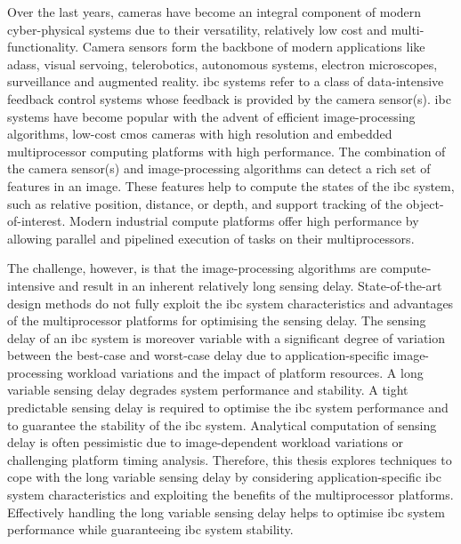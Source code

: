 \glsresetall
{}

\begin{sloppypar}
Over the last years, cameras have become an integral component of modern cyber-physical systems due to their versatility, relatively low cost and multi-functionality. Camera sensors form the backbone of modern applications like \glspl{adas}, visual servoing, telerobotics, autonomous systems, electron microscopes, surveillance and augmented reality. \Gls{ibc} systems refer to a class of data-intensive feedback control systems whose feedback is provided by the camera sensor(s). \Gls{ibc} systems have become popular with the advent of efficient image-processing algorithms, low-cost \gls{cmos} cameras with high resolution and embedded multiprocessor computing platforms with high performance. The combination of the camera sensor(s) and image-processing algorithms can detect a rich set of features in an image. These features help to compute the states of the \gls{ibc} system, such as relative position, distance, or depth, and support tracking of the object-of-interest. Modern industrial compute platforms offer high performance by allowing parallel and pipelined execution of tasks on their multiprocessors.
\end{sloppypar}
The challenge, however, is that the image-processing algorithms are compute-intensive and result in an inherent relatively long sensing delay. State-of-the-art design methods do not fully exploit the \gls{ibc} system characteristics and advantages of the multiprocessor platforms for optimising the sensing delay. The sensing delay of an \gls{ibc} system is moreover variable with a significant degree of variation between the best-case and worst-case delay due to application-specific image-processing workload variations and the impact of platform resources. A long variable sensing delay degrades system performance and stability. A tight predictable sensing delay is required to optimise the \gls{ibc} system performance and to guarantee the stability of the \gls{ibc} system. Analytical computation of sensing delay is often pessimistic due to image-dependent workload variations or challenging platform timing analysis. Therefore, this thesis explores techniques to cope with the long variable sensing delay by considering application-specific \gls{ibc} system characteristics and exploiting the benefits of the multiprocessor platforms. Effectively handling the long variable sensing delay helps to optimise \gls{ibc} system performance while guaranteeing \gls{ibc} system stability.


